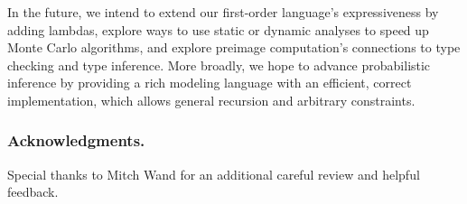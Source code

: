 \documentclass{llncs}
\begin{document}
In the future, we intend to extend our first-order language's expressiveness by adding lambdas, explore ways to use static or dynamic analyses to speed up Monte Carlo algorithms, and explore preimage computation's connections to type checking and type inference.
More broadly, we hope to advance probabilistic inference by providing a rich modeling language with an efficient, correct implementation, which allows general recursion and arbitrary constraints.


\subsubsection*{Acknowledgments.} Special thanks to Mitch Wand for an additional careful review and helpful feedback.




\end{document}
